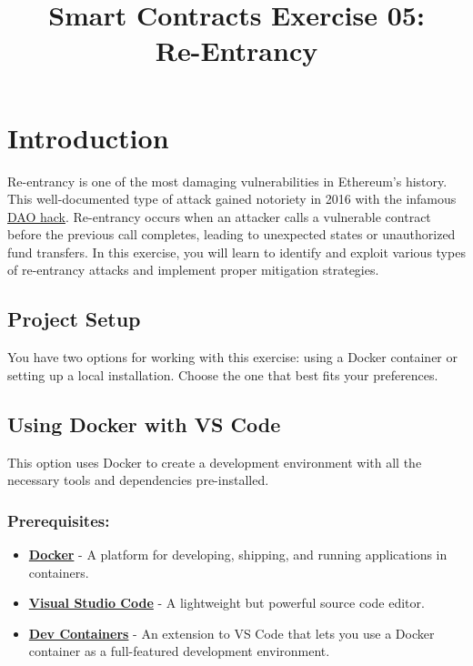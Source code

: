 \documentclass[12pt]{article}
\title{Smart Contracts Exercise 05: \\ Re-Entrancy}
\author{}
\date{}
\begin{document}
\maketitle
\section{Introduction}

Re-entrancy is one of the most damaging vulnerabilities in Ethereum's history.
This well-documented type of attack gained notoriety in 2016 with the infamous
\href{https://en.wikipedia.org/wiki/The_DAO}{DAO hack}. Re-entrancy occurs when
an attacker calls a vulnerable contract before the previous call completes,
leading to unexpected states or unauthorized fund transfers. In this exercise,
you will learn to identify and exploit various types of re-entrancy attacks and
implement proper mitigation strategies.

\subsection*{Project Setup}

You have two options for working with this exercise: using a Docker container
or setting up a local installation. Choose the one that best fits your
preferences.

\subsection{Using Docker with VS Code}

This option uses Docker to create a development environment with all the
necessary tools and dependencies pre-installed.

\subsubsection*{Prerequisites:}

\begin{itemize}
    \item \textbf{\href{https://www.docker.com/products/docker-desktop}{Docker}} - A platform for developing, shipping, and running applications in containers.
    \item \textbf{\href{https://code.visualstudio.com/}{Visual Studio Code}} - A lightweight but powerful source code editor.
    \item \textbf{\href{https://marketplace.visualstudio.com/items?itemName=ms-vscode-remote.remote-containers}{Dev Containers}} - An extension to VS Code that lets you use a Docker container as a full-featured development environment.
\end{itemize}
\end{document}
